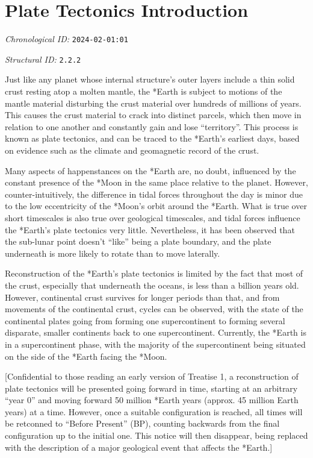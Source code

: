 \section{Plate Tectonics Introduction}
\emph{Chronological ID:} \texttt{2024-02-01:01}

\emph{Structural ID:} \texttt{2.2.2}

Just like any planet whose internal structure's outer layers include a thin solid crust resting atop a molten mantle, the *Earth is subject to motions of the mantle material disturbing the crust material over hundreds of millions of years. This causes the crust material to crack into distinct parcels, which then move in relation to one another and constantly gain and lose ``territory''. This process is known as plate tectonics, and can be traced to the *Earth's earliest days, based on evidence such as the climate and geomagnetic record of the crust.

Many aspects of happenstances on the *Earth are, no doubt, influenced by the constant presence of the *Moon in the same place relative to the planet. However, counter-intuitively, the difference in tidal forces throughout the day is minor due to the low eccentricity of the *Moon's orbit around the *Earth. What is true over short timescales is also true over geological timescales, and tidal forces influence the *Earth's plate tectonics very little. Nevertheless, it has been observed that the sub-lunar point doesn't ``like'' being a plate boundary, and the plate underneath is more likely to rotate than to move laterally.

Reconstruction of the *Earth's plate tectonics is limited by the fact that most of the crust, especially that underneath the oceans, is less than a billion years old. However, continental crust survives for longer periods than that, and from movements of the continental crust, cycles can be observed, with the state of the continental plates going from forming one supercontinent to forming several disparate, smaller continents back to one supercontinent. Currently, the *Earth is in a supercontinent phase, with the majority of the supercontinent being situated on the side of the *Earth facing the *Moon.

[Confidential to those reading an early version of Treatise 1, a reconstruction of plate tectonics will be presented going forward in time, starting at an arbitrary ``year 0'' and moving forward 50 million *Earth years (approx. 45 million Earth years) at a time. However, once a suitable configuration is reached, all times will be retconned to ``Before Present'' (BP), counting backwards from the final configuration up to the initial one. This notice will then disappear, being replaced with the description of a major geological event that affects the *Earth.]
\newpage
